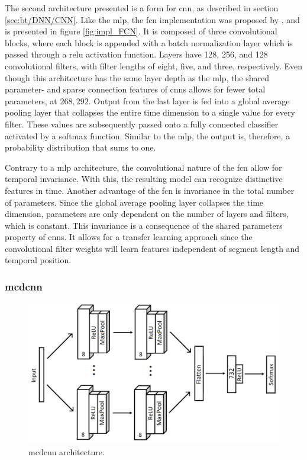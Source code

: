 The second architecture presented is a form for \acrshort{cnn}, as described in section \ref{sec:bt/DNN/CNN}. Like the \acrshort{mlp}, the \acrfull{fcn} implementation was proposed by \textcite{wang2016}, and is presented in figure \ref{fig:impl_FCN}. It is composed of three convolutional blocks, where each block is appended with a batch normalization layer which is passed through a \acrshort{relu} activation function. Layers have 128, 256, and 128 convolutional filters, with filter lengths of eight, five, and three, respectively. Even though this architecture has the same layer depth as the \acrshort{mlp}, the shared parameter- and sparse connection features of \acrshort{cnn}s allows for fewer total parameters, at $268,292$. Output from the last layer is fed into a global average pooling layer that collapses the entire time dimension to a single value for every filter. These values are subsequently passed onto a fully connected classifier activated by a softmax function. Similar to the \acrshort{mlp}, the output is, therefore, a probability distribution that sums to one.


Contrary to a \acrshort{mlp} architecture, the convolutional nature of the \acrshort{fcn} allow for temporal invariance. With this, the resulting model can recognize distinctive features in time. Another advantage of the \acrshort{fcn} is invariance in the total number of parameters. Since the global average pooling layer collapses the time dimension, parameters are only dependent on the number of layers and filters, which is constant. This invariance is a consequence of the shared parameters property of \acrshort{cnn}s. It allows for a transfer learning approach since the convolutional filter weights will learn features independent of segment length and temporal position.

\newpage
\subsubsection{\acrlong{mcdcnn}}

\begin{figure}[h]
    \centering
    \includegraphics[width=\textwidth]{figures/impl_MCDCNN.png}
    \caption{\acrlong{mcdcnn} architecture.}
    \label{fig:impl_MCDCNN}
\end{figure}

